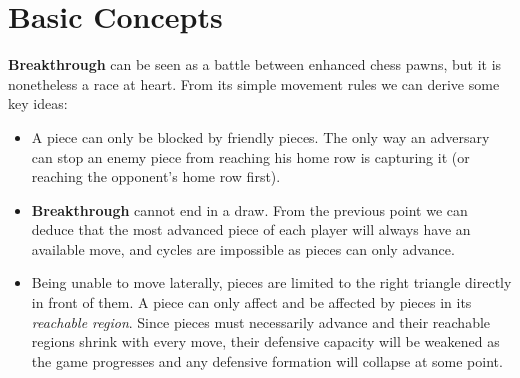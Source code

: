 \documentclass[a4paper,12pt]{article}
\newcommand{\BT}{\textbf{Breakthrough}\xspace}  %
\begin{document}
\newpage


    \section{Basic Concepts}

    \BT can be seen as a battle between enhanced chess pawns, but it is nonetheless a race at heart.  From its simple movement rules we can derive some key ideas:

    \begin{itemize}
        \item A piece can only be blocked by friendly pieces.  The only way an adversary can stop an enemy piece from reaching his home row is capturing it (or reaching the opponent's home row first).
        \item \BT cannot end in a draw.  From the previous point we can deduce that the most advanced piece of each player will always have an available move, and cycles are impossible as pieces can only advance.
        \item Being unable to move laterally, pieces are limited to the right triangle directly in front of them.  A piece can only affect and be affected by pieces in its \emph{reachable region}.  Since pieces must necessarily advance and their reachable regions shrink with every move, their defensive capacity will be weakened as the game progresses and any defensive formation will collapse at some point.
    \end{itemize}
\end{document}
